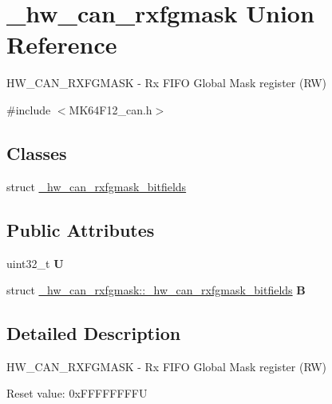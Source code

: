 \hypertarget{union__hw__can__rxfgmask}{}\section{\+\_\+hw\+\_\+can\+\_\+rxfgmask Union Reference}
\label{union__hw__can__rxfgmask}


H\+W\+\_\+\+C\+A\+N\+\_\+\+R\+X\+F\+G\+M\+A\+SK -\/ Rx F\+I\+FO Global Mask register (RW)  




{\ttfamily \#include $<$M\+K64\+F12\+\_\+can.\+h$>$}

\subsection*{Classes}
\begin{DoxyCompactItemize}
\item 
struct \hyperlink{struct__hw__can__rxfgmask_1_1__hw__can__rxfgmask__bitfields}{\+\_\+hw\+\_\+can\+\_\+rxfgmask\+\_\+bitfields}
\end{DoxyCompactItemize}
\subsection*{Public Attributes}
\begin{DoxyCompactItemize}
\item 
uint32\+\_\+t {\bfseries U}\hypertarget{union__hw__can__rxfgmask_a715e2e2ea8fa4d8085d2b0c7ef1f2ab7}{}\label{union__hw__can__rxfgmask_a715e2e2ea8fa4d8085d2b0c7ef1f2ab7}

\item 
struct \hyperlink{struct__hw__can__rxfgmask_1_1__hw__can__rxfgmask__bitfields}{\+\_\+hw\+\_\+can\+\_\+rxfgmask\+::\+\_\+hw\+\_\+can\+\_\+rxfgmask\+\_\+bitfields} {\bfseries B}\hypertarget{union__hw__can__rxfgmask_a75b148a7cbf1c8b3ed2c84f2698ab090}{}\label{union__hw__can__rxfgmask_a75b148a7cbf1c8b3ed2c84f2698ab090}

\end{DoxyCompactItemize}


\subsection{Detailed Description}
H\+W\+\_\+\+C\+A\+N\+\_\+\+R\+X\+F\+G\+M\+A\+SK -\/ Rx F\+I\+FO Global Mask register (RW) 

Reset value\+: 0x\+F\+F\+F\+F\+F\+F\+F\+FU

